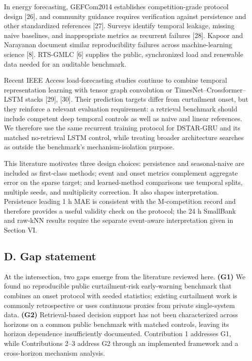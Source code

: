 \documentclass[
  10pt,
  a4paper,
]{article}
\begin{document}
In energy forecasting, GEFCom2014 establishes competition-grade protocol
design {[}26{]}, and community guidance requires verification against
persistence and other standardized references {[}27{]}. Surveys identify
temporal leakage, missing naive baselines, and inappropriate metrics as
recurrent failures {[}28{]}. Kapoor and Narayanan document similar
reproducibility failures across machine-learning science {[}8{]}.
RTS-GMLC {[}6{]} supplies the public, synchronized load and renewable
data needed for an auditable benchmark.

Recent IEEE Access load-forecasting studies continue to combine temporal
representation learning with tensor graph convolution or
TimesNet--Crossformer--LSTM stacks {[}29{]}, {[}30{]}. Their prediction
targets differ from curtailment onset, but they reinforce a relevant
evaluation requirement: a retrieval benchmark should include competent
deep temporal controls as well as naive and linear references. We
therefore use the same recurrent training protocol for DSTAR-GRU and its
matched no-retrieval LSTM control, while treating broader architecture
searches as outside the benchmark's mechanism-isolation purpose.

This literature motivates three design choices: persistence and
seasonal-naive are included as first-class methods; event and onset
metrics complement aggregate error on the sparse target; and
learned-method comparisons use temporal splits, multiple seeds, and
multiplicity correction. It also shapes interpretation. Persistence
leading 1 h MAE is consistent with the M-competition record and therefore
provides a useful validity check on the protocol; the 24 h SmallBank and
raw-kNN results require the separate event-aware interpretation given in
Section VI.

\subsection{D. Gap statement}\label{d.-gap-statement}

At the intersection, two gaps emerge from the literature reviewed here.
\textbf{(G1)} We found no reproducible public curtailment-risk
early-warning benchmark that combines an onset protocol with seeded
statistics; existing curtailment work is commonly retrospective or uses
continuous proxies from private single-system data. \textbf{(G2)}
Retrieval-based decision support has not been characterized across
horizons on a common public benchmark with matched controls, leaving its
horizon dependence insufficiently documented. Contribution 1 addresses
G1, while Contributions 2--3 address G2 through an implemented framework
and a cross-horizon mechanism analysis.
\end{document}
